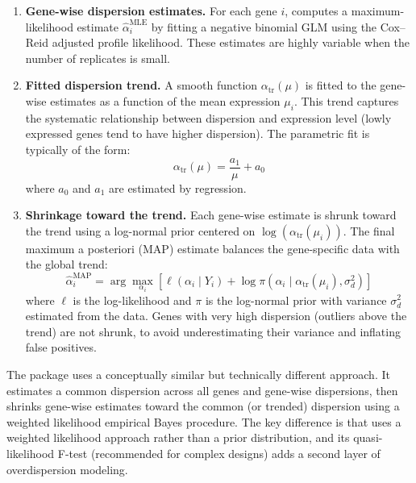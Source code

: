 \begin{enumerate}[nosep]
  \item \textbf{Gene-wise dispersion estimates.} For each gene $i$,
     computes a maximum-likelihood estimate $\hat{\alpha}_i^{\text{MLE}}$
    by fitting a negative binomial GLM using the Cox--Reid adjusted profile
    likelihood. These estimates are highly variable when the number of replicates
    is small.
  \item \textbf{Fitted dispersion trend.} A smooth function
    $\alpha_{\text{tr}}(\mu)$ is fitted to the gene-wise estimates as a function
    of the mean expression $\mu_i$. This trend captures the systematic
    relationship between dispersion and expression level (lowly expressed genes
    tend to have higher dispersion). The parametric fit is typically of the form:
    \begin{equation}
      \label{eq:rnaseq:disptrend}
      \alpha_{\text{tr}}(\mu) = \frac{a_1}{\mu} + a_0
    \end{equation}
    where $a_0$ and $a_1$ are estimated by regression.
  \item \textbf{Shrinkage toward the trend.} Each gene-wise estimate is
    shrunk toward the trend using a log-normal prior centered on
    $\log(\alpha_{\text{tr}}(\mu_i))$. The final maximum a posteriori (MAP)
    estimate balances the gene-specific data with the global trend:
    \begin{equation}
      \label{eq:rnaseq:dispmap}
      \hat{\alpha}_i^{\text{MAP}} = \arg\max_{\alpha_i}
        \left[
          \ell(\alpha_i \mid Y_i) +
          \log \pi(\alpha_i \mid \alpha_{\text{tr}}(\mu_i), \sigma_d^2)
        \right]
    \end{equation}
    where $\ell$ is the log-likelihood and $\pi$ is the log-normal prior with
    variance $\sigma_d^2$ estimated from the data. Genes with very high
    dispersion (outliers above the trend) are not shrunk, to avoid
    underestimating their variance and inflating false positives.
\end{enumerate}

\begin{tipbox}
The  package uses a conceptually similar but technically
different approach. It estimates a common dispersion across all genes and
gene-wise dispersions, then shrinks gene-wise estimates toward the common
(or trended) dispersion using a weighted likelihood empirical Bayes procedure.
The key difference is that  uses a weighted likelihood approach
rather than a prior distribution, and its quasi-likelihood F-test (recommended
for complex designs) adds a second layer of overdispersion modeling.
\end{tipbox}

